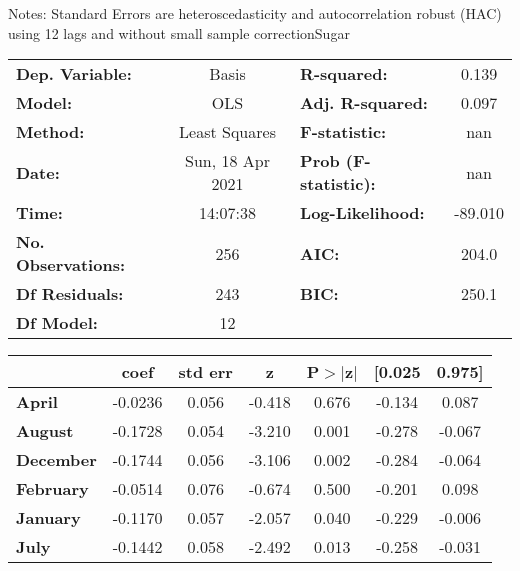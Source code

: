 Notes: \newline
 [1] Standard Errors are heteroscedasticity and autocorrelation robust (HAC) using 12 lags and without small sample correctionSugar\begin{center}
\begin{tabular}{lclc}
\toprule
\textbf{Dep. Variable:}    &      Basis       & \textbf{  R-squared:         } &     0.139   \\
\textbf{Model:}            &       OLS        & \textbf{  Adj. R-squared:    } &     0.097   \\
\textbf{Method:}           &  Least Squares   & \textbf{  F-statistic:       } &       nan   \\
\textbf{Date:}             & Sun, 18 Apr 2021 & \textbf{  Prob (F-statistic):} &      nan    \\
\textbf{Time:}             &     14:07:38     & \textbf{  Log-Likelihood:    } &   -89.010   \\
\textbf{No. Observations:} &         256      & \textbf{  AIC:               } &     204.0   \\
\textbf{Df Residuals:}     &         243      & \textbf{  BIC:               } &     250.1   \\
\textbf{Df Model:}         &          12      & \textbf{                     } &             \\
\bottomrule
\end{tabular}
\begin{tabular}{lcccccc}
                   & \textbf{coef} & \textbf{std err} & \textbf{z} & \textbf{P$> |$z$|$} & \textbf{[0.025} & \textbf{0.975]}  \\
\midrule
\textbf{April}     &      -0.0236  &        0.056     &    -0.418  &         0.676        &       -0.134    &        0.087     \\
\textbf{August}    &      -0.1728  &        0.054     &    -3.210  &         0.001        &       -0.278    &       -0.067     \\
\textbf{December}  &      -0.1744  &        0.056     &    -3.106  &         0.002        &       -0.284    &       -0.064     \\
\textbf{February}  &      -0.0514  &        0.076     &    -0.674  &         0.500        &       -0.201    &        0.098     \\
\textbf{January}   &      -0.1170  &        0.057     &    -2.057  &         0.040        &       -0.229    &       -0.006     \\
\textbf{July}      &      -0.1442  &        0.058     &    -2.492  &         0.013        &       -0.258    &       -0.031     \\

\end{tabular}
\end{center}

